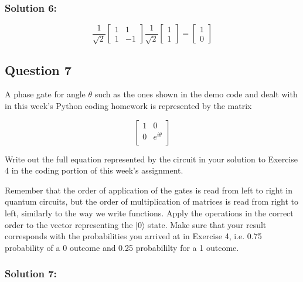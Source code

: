 \documentclass{article}
\begin{document}
\subsubsection*{Solution 6:}

\[\frac1{\sqrt2}\begin{bmatrix}1&1\\1&-1\end{bmatrix}\frac1{\sqrt2}\begin{bmatrix}1\\1\end{bmatrix}=\begin{bmatrix}1\\0\end{bmatrix}\]

\subsection*{Question 7}

A phase gate for angle $\theta$ such as the ones shown in the demo code and dealt with in this week's Python coding homework is represented by the matrix

\begin{equation*}
    \begin{bmatrix}
        1 & 0 \\
        0 & e^{i\theta} \\
    \end{bmatrix}
\end{equation*}

Write out the full equation represented by the circuit in your solution to Exercise 4 in the coding portion of this week's assignment.

Remember that the order of application of the gates is read from left to right in quantum circuits, but the order of multiplication of matrices is read from right to left, similarly to the way we write functions. Apply the operations in the correct order to the vector representing the $|0\rangle$ state. Make sure that your result corresponds with the probabilities you arrived at in Exercise 4, i.e. 0.75 probability of a 0 outcome and 0.25 probabililty for a 1 outcome.

\subsubsection*{Solution 7:}
\end{document}

